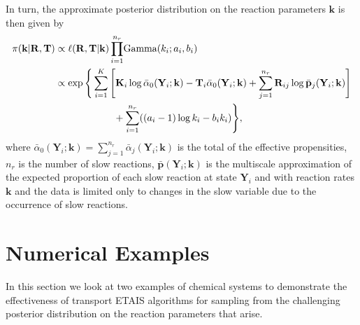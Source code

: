 \documentclass[final]{siamltex}
\begin{document}
In turn, the approximate posterior distribution on the reaction
parameters $\mathbf{k}$ is then given by
\begin{align}
	\pi(\mathbf{k}|\mathbf{R}, \mathbf{T}) &\propto \ell(\mathbf{R}, \mathbf{T}|\mathbf{k})
	\prod_{i=1}^{n_r} \! \text{Gamma}(k_i; a_i, b_i) \notag \\
		&\propto \exp\Bigg\{\sum\limits_{i=1}^K \Bigg[
				\mathbf{K}_i\log
                  \bar{\alpha}_0(\mathbf{Y}_i; \mathbf{k}) -
                  \mathbf{T}_i \bar{\alpha}_0(\mathbf{Y}_i; \mathbf{k}) %
				+\sum_{j=1}^{n_r} \mathbf{R}_{ij}\log \bar{\mathbf{p}}_j(\mathbf{Y}_i; \mathbf{k})
			\Bigg]  \notag\\
		&	\qquad\qquad\qquad{} + \sum_{i=1}^{n_r} ((a_i-1)\log k_i - b_ik_i)\Bigg\}, \label{eq:Apos}
\end{align}
where $\bar{\alpha}_0(\mathbf{Y}_i; \mathbf{k}) = \sum_{j=1}^{n_r}
\bar{\alpha}_j(\mathbf{Y}_i; \mathbf{k})$ is the total of the
effective propensities, $n_r$ is the number of slow reactions,
$\bar{\mathbf{p}}(\mathbf{Y}_i; \mathbf{k})$ is the multiscale
approximation of the expected proportion of each slow reaction at
state $\mathbf{Y}_i$ and with reaction rates $\mathbf{k}$ and the
data is limited only to changes in the slow variable due to the
occurrence of slow reactions.
\section{Numerical Examples}\label{sec:num}
In this section we look at two examples of chemical systems to
demonstrate the effectiveness of transport ETAIS algorithms for
sampling from the
challenging posterior distribution on the reaction parameters that
arise. 

\end{document}
